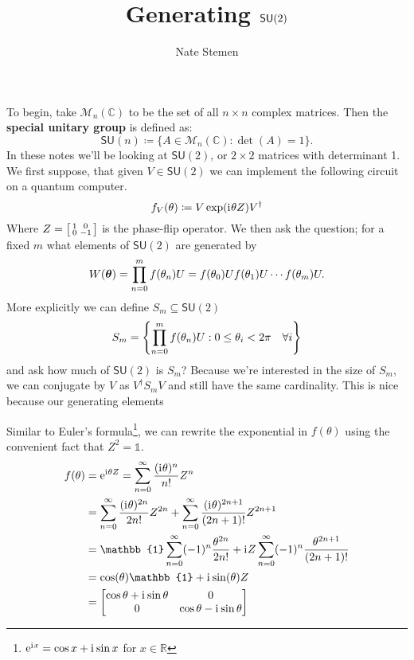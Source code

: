 \documentclass[12pt]{article}
\title{Generating $\SU{2}$}
\author{Nate Stemen}
\newcommand{\SU}[1]{\mathsf{SU}(#1)}
\newcommand{\matgroup}[2]{\mathcal{M}_{#1} (#2)}
\newcommand{\C}{\mathbb{C}}
\newcommand{\R}{\mathbb{R}}
\newcommand{\idmat}{\mathbb{1}}
\newcommand{\iu}{\mathrm{i}\mkern1mu}
\newcommand{\e}{\mathrm{e}}
\begin{document}
\maketitle

To begin, take $\matgroup{n}{\C}$ to be the set of all $n\times n$ complex matrices. Then the \textbf{special unitary group} is defined as:
\begin{equation}
	\SU{n}\coloneqq\{A\in\matgroup{n}{\C}: \det(A) = 1\}.
\end{equation}
In these notes we'll be looking at $\SU{2}$, or $2\times 2$ matrices with determinant 1. We first suppose, that given $V\in\SU{2}$ we can implement the following circuit on a quantum computer.
\begin{equation}
	f_V(\theta)\coloneqq V\exp(\iu\theta Z)V^\dagger
\end{equation}
Where $Z = \smqty[1 & 0 \\ 0 & -1]$ is the phase-flip operator. We then ask the question; for a fixed $m$ what elements of $\SU{2}$ are generated by
\begin{equation}
	W(\vb*{\theta}) = \prod_{n = 0}^mf(\theta_n)U = f(\theta_0)Uf(\theta_1)U\cdots f(\theta_m)U.
\end{equation}
More explicitly we can define $S_m\subseteq\SU{2}$
\begin{equation}
	S_m = \qty{\prod_{n = 0}^mf(\theta_n)U : 0\leq\theta_i < 2\pi\quad\forall i}
\end{equation}
and ask how much of $\SU{2}$ is $S_m$? Because we're interested in the size of $S_m$, we can conjugate by $V$ as $V^\dagger S_m V$ and still have the same cardinality. This is nice because our generating elements

Similar to Euler's formula\footnote{$\e^{\iu x} = \cos{x} + \iu\sin{x}$ for $x\in\R$}, we can rewrite the exponential in $f(\theta)$ using the convenient fact that $Z^2 = \idmat$.
\begin{align}
	f(\theta) & = \e^{\iu\theta Z} = \sum_{n = 0}^\infty\frac{(\iu \theta)^n}{n!}Z^n                                                      \\
	& = \sum_{n = 0}^\infty\frac{(\iu \theta)^{2n}}{2n!}Z^{2n} + \sum_{n = 0}^\infty\frac{(\iu \theta)^{2n+1}}{(2n+1)!}Z^{2n+1} \\
	& = \idmat\sum_{n = 0}^\infty (-1)^n\frac{\theta^{2n}}{2n!} + \iu Z\sum_{n = 0}^\infty (-1)^n\frac{\theta^{2n+1}}{(2n+1)!}  \\
	& = \cos(\theta)\idmat + \iu\sin(\theta)Z \\
	& = \mqty[\cos\theta + \iu\sin\theta & 0 \\ 0 & \cos\theta - \iu\sin\theta]
\end{align}
\end{document}
